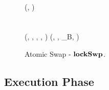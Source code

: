 \begin{landscape}
\begin{figure}
{{        \opFunResult \procDSharedOutputMwTxL{\funArray{\varSpendableCoin}}{\varAmountMW}{\cnstFalsum} \< \< \< \< \opFunResult \procDSharedOutputMwTxR{\varAmountMW} \\
        (\varMwRefundTx, \funStarAlt{\varSpendableCoinAlice}) \< \< \< \< \varMwRefundTx \pcskipln \\
        \opFunResult \procDSharedInpMwTxL{\funStar{\varPtSpendableCoinAlice}}{\varAmountMW}{\varTimeMW} \< \< \< \< \opFunResult \procDSharedInpMwTxR{\funStar{\varPtSpendableCoinBob}}{\varAmountMW} \\
        \procPublishMW{\funArray{\varMwFundTx,\varMwRefundTx}}  \\
        \pcreturn (\varSwpState, \funStar{\varPtSpendableCoinAlice}, \funStar{\varSpendableCoinAlice}, \varSecKeyAlice, \funStarAlt{\varSpendableCoinAlice}) \< \< \< \< \pcreturn (\varSwpState, \funStar{\varPtSpendableCoinBob}, \varUTXO_{B}, \varWit)
        }
        }
        \caption{Atomic Swap - $\mathbf{lockSwp}$.}\label{fig:setup-swap}
    \end{figure}
\end{landscape}
\restoregeometry

\subsection{Execution Phase}\label{subsec:atom:exec}

